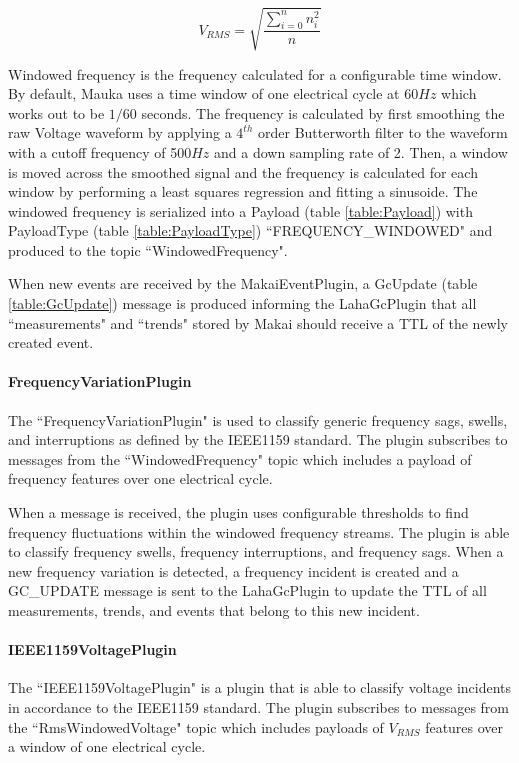 \begin{equation}
\label{equation:Vrms}
	V_{RMS} = \sqrt{\frac{\sum_{i=0}^{n} n_{i}^2}{n}}
\end{equation}

Windowed frequency is the frequency calculated for a configurable time window. By default, Mauka uses a time window of one electrical cycle at 60$Hz$ which works out to be $1/60$ seconds. The frequency is calculated by first smoothing the raw Voltage waveform by applying a $4^{th}$ order Butterworth filter to the waveform with a cutoff frequency of 500$Hz$ and a down sampling rate of 2. Then, a window is moved across the smoothed signal and the frequency is calculated for each window by performing a least squares regression and fitting a sinusoide. The windowed frequency is serialized into a Payload (table \ref{table:Payload}) with PayloadType (table \ref{table:PayloadType}) ``FREQUENCY\_WINDOWED" and produced to the topic ``WindowedFrequency".

When new events are received by the MakaiEventPlugin, a GcUpdate (table \ref{table:GcUpdate}) message is produced informing the LahaGcPlugin that all ``measurements" and ``trends" stored by Makai should receive a TTL of the newly created event.

\paragraph{FrequencyVariationPlugin}
The ``FrequencyVariationPlugin" is used to classify generic frequency sags, swells, and interruptions as defined by the IEEE1159 standard\cite{IEEE:2018:1159D3}. The plugin subscribes to messages from the ``WindowedFrequency" topic which includes a payload of frequency features over one electrical cycle.

When a message is received, the plugin uses configurable thresholds to find frequency fluctuations within the windowed frequency streams. The plugin is able to classify frequency swells, frequency interruptions, and frequency sags. When a new frequency variation is detected, a frequency incident is created and a GC\_UPDATE message is sent to the LahaGcPlugin to update the TTL of all measurements, trends, and events that belong to this new incident.

\paragraph{IEEE1159VoltagePlugin}
The ``IEEE1159VoltagePlugin" is a plugin that is able to classify voltage incidents in accordance to the IEEE1159 standard\cite{IEEE:2018:1159D3}. The plugin subscribes to messages from the ``RmsWindowedVoltage" topic which includes payloads of $V_{RMS}$ features over a window of one electrical cycle.

